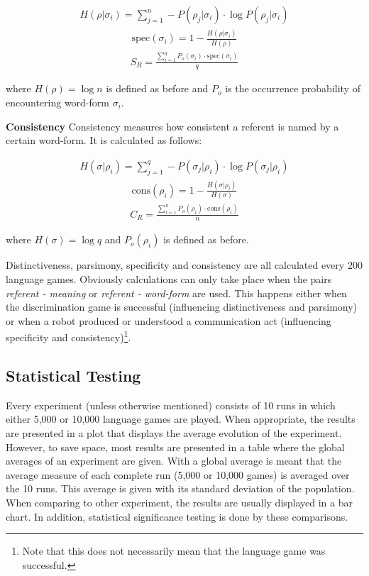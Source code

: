\begin{description}
\begin{eqnarray}
H(\rho|\sigma_i)=\sum_{j=1}^n -P(\rho_j|\sigma_i) \cdot \log P(\rho_j|\sigma_i)
\end{eqnarray}
\begin{eqnarray}
\mbox{spec}(\sigma_i)=1-\frac{H(\rho|\sigma_i)}{H(\rho)}
\end{eqnarray}
\begin{eqnarray}
S_R=\frac{\sum_{i=1}^q P_o(\sigma_i) \cdot \mbox{spec}(\sigma_i)}{q}
\end{eqnarray}


where $H(\rho)=\log n$ is defined as before and $P_o$ is the occurrence probability of encountering word-form $\sigma_i$.

\item {\bf Consistency} Consistency measures how consistent a referent is named by a certain word-form. It is calculated as follows:

\begin{eqnarray}
H(\sigma|\rho_i)=\sum_{j=1}^q -P(\sigma_j|\rho_i) \cdot \log P(\sigma_j|\rho_i)
\end{eqnarray}
\begin{eqnarray}
\mbox{cons}(\rho_i)=1-\frac{H(\sigma|\rho_i)}{H(\sigma)}
\end{eqnarray}
\begin{eqnarray}
C_R=\frac{\sum_{i=1}^n P_o(\rho_i) \cdot \mbox{cons}(\rho_i)}{n}
\end{eqnarray}


where $H(\sigma)=\log q$ and $P_o(\rho_i)$ is defined as before.

\end{description}


Distinctiveness, parsimony, specificity and consistency are all calculated every 200 language games. Obviously calculations can only take place when the pairs {\em referent - meaning} or {\em referent - word-form} are used. This happens either when the discrimination game is successful (influencing distinctiveness and parsimony) or when a robot produced or understood a communication act (influencing specificity and consistency)\footnote{Note that this does not necessarily mean that the language game was successful.}.

\subsection{Statistical Testing}

Every experiment (unless otherwise mentioned) consists of 10 runs in which either 5,000 or 10,000 language games are played. When appropriate, the results are presented in a plot that displays the average evolution of the experiment. However, to save space, most results are presented in a table where the global averages of an experiment are given. With a global average is meant that the average measure of each complete run (5,000 or 10,000 games) is averaged over the 10 runs. This average is given with its standard deviation of the population. When comparing to other experiment, the results are usually displayed in a bar chart. In addition, statistical significance testing is done by these comparisons.
	
